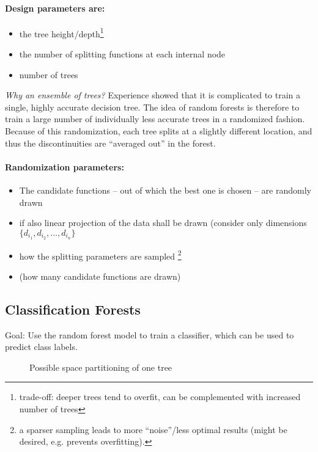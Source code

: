 \paragraph{Design parameters are:}
\begin{itemize}
  \item the tree height/depth\footnote{ trade-off: deeper trees tend to overfit, can be complemented with increased number of trees}
  \item the number of splitting functions at each internal node
  \item number of trees
\end{itemize}

\textit{Why an ensemble of trees?} Experience showed that it is complicated to train a single, highly accurate decision tree. The idea of random forests is therefore to train a large number of individually less accurate trees in a randomized fashion. Because of this randomization, each tree splits at a slightly different location, and thus the discontinuities are ``averaged out'' in the forest.

\paragraph{Randomization parameters:}
\begin{itemize}
  \item The candidate functions -- out of which the best one is chosen -- are randomly drawn
  \item if also linear projection of the data shall be drawn (\eg consider only dimensions \(\{d_{i_1}, d_{i_2}, \dots, d_{i_n}\}\)
  \item how the splitting parameters are sampled \footnote{a sparser sampling leads to more ``noise''/less optimal results (might be desired, e.g. prevents overfitting).}
  \item (how many candidate functions are drawn)
\end{itemize}

\subsection{Classification Forests}
Goal: Use the random forest model to train a classifier, which can be used to predict class labels.

\begin{figure}[H]
  \centering
  
  \caption{Possible space partitioning of one tree}
\end{figure}


